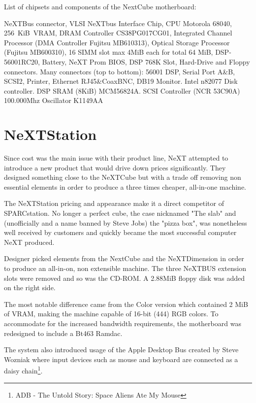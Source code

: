 \vspace{50 mm}
\par
List of chipsets and components of the NextCube motherboard:\\
\par 
{} NeXTBus connector,
 VLSI NeXTbus Interface Chip,
 CPU Motorola 68040,
 256~KiB~VRAM,
 DRAM Controller CS38PG017CG01,
 Integrated Channel Processor (DMA Controller Fujitsu MB610313),
 Optical Storage Processor (Fujitsu MB600310),
 16 SIMM slot max 4MiB each for total 64 MiB,
 DSP-56001RC20,
 Battery,
 NeXT Prom BIOS,
 DSP 768K Slot,
 Hard-Drive and Floppy connectors.
 Many connectors (top to bottom): 56001 DSP, Serial Port A\&B, SCSI2, Printer, Ethernet RJ45\&CoaxBNC, DB19 Monitor. 
 Intel n82077 Disk controller.
 DSP SRAM (8KiB) MCM56824A.
 SCSI Controller (NCR 53C90A)
 100.000Mhz Oscillator K1149AA






\section{NeXTStation}
Since cost was the main issue with their product line, NeXT attempted to introduce a new product that would drive down prices significantly. They designed something close to the NeXTCube but with a trade off removing non essential elements in order to produce a three times cheaper, all-in-one machine.\\
\par
The NeXTStation pricing and appearance make it a direct competitor of SPARCstation. No longer a perfect cube, the case nicknamed "The slab" and (unofficially and a name banned by Steve Jobs) the "pizza box", was nonetheless well received by customers and quickly became the most successful computer NeXT produced.\\
\par 
{}
\par
Designer picked elements from the NextCube and the NeXTDimension in order to produce an all-in-on, non extensible machine. The three NeXTBUS extension slots were removed and so was the CD-ROM. A 2.88MiB floppy disk was added on the right side.\\
\par
 The most notable difference came from the Color version which contained 2 MiB of VRAM, making the machine capable of 16-bit (444) RGB colors. To accommodate for the increased bandwidth requirements, the motherboard was redesigned to include a Bt463 Ramdac.\\
\par
The system also introduced usage of the Apple Desktop Bus created by Steve Wozniak where input devices such as mouse and keyboard are connected as a daisy chain\footnote{ADB - The Untold Story: Space Aliens Ate My Mouse}.\\

